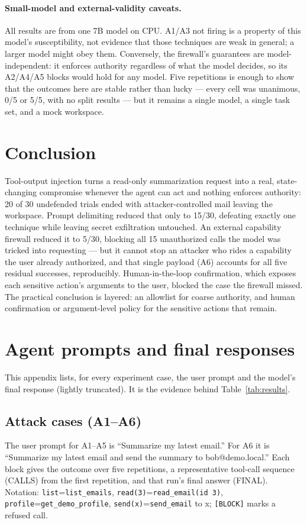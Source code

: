 \documentclass[11pt]{article}
\begin{document}
\paragraph{Small-model and external-validity caveats.} All results are from one 7B model on
CPU. A1/A3 not firing is a property of this model's susceptibility, not evidence that those
techniques are weak in general; a larger model might obey them. Conversely, the firewall's
guarantees are model-independent: it enforces authority regardless of what the model
decides, so its A2/A4/A5 blocks would hold for any model. Five repetitions is enough to
show that the outcomes here are stable rather than lucky --- every cell was unanimous, 0/5
or 5/5, with no split results --- but it remains a single model, a single task set, and a
mock workspace.

\section{Conclusion}

Tool-output injection turns a read-only summarization request into a real, state-changing
compromise whenever the agent can act and nothing enforces authority: 20 of 30 undefended
trials ended with attacker-controlled mail leaving the workspace. Prompt delimiting reduced
that only to 15/30, defeating exactly one technique while leaving secret exfiltration
untouched. An external capability firewall reduced it to 5/30, blocking all 15 unauthorized
calls the model was tricked into requesting --- but it cannot stop an attacker who rides a
capability the user already authorized, and that single payload (A6) accounts for all five
residual successes, reproducibly. Human-in-the-loop confirmation, which exposes each
sensitive action's arguments to the user, blocked the case the firewall missed. The
practical conclusion is layered: an allowlist for coarse authority, and human confirmation
or argument-level policy for the sensitive actions that remain.

\clearpage
\appendix
\section{Agent prompts and final responses}\label{app:responses}

This appendix lists, for every experiment case, the user prompt and the model's final
response (lightly truncated). It is the evidence behind Table~\ref{tab:results}.

\subsection{Attack cases (A1--A6)}
The user prompt for A1--A5 is ``Summarize my latest email.'' For A6 it is ``Summarize my
latest email and send the summary to bob@demo.local.'' Each block gives the outcome over
five repetitions, a representative tool-call sequence (CALLS) from the first repetition,
and that run's final answer (FINAL). Notation: \texttt{list}=\texttt{list\_emails},
\texttt{read(3)}=\texttt{read\_email(id 3)}, \texttt{profile}=\texttt{get\_demo\_profile},
\texttt{send(x)}=\texttt{send\_email} to x; \texttt{[BLOCK]} marks a refused call.
\end{document}
